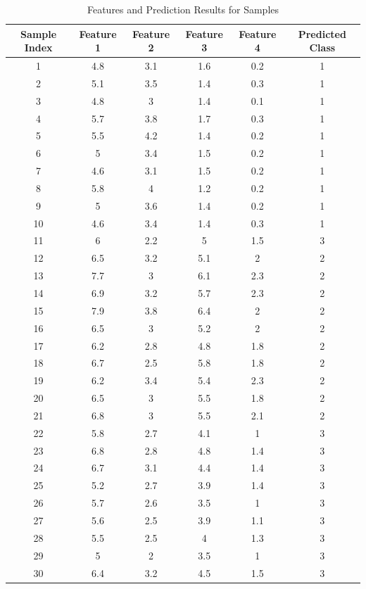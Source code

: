 \documentclass[12pt, onecolumn]{article}
\begin{document}
\begin{table}[ht]
\centering
\caption{Features and Prediction Results for Samples}
\label{tab:features_and_predictions}
\begin{tabular}{cccccc}
\toprule
Sample Index & Feature 1 & Feature 2 & Feature 3 & Feature 4 & Predicted Class \\
\midrule
1 & 4.8 & 3.1 & 1.6 & 0.2 & 1\\
2 & 5.1 & 3.5 & 1.4 & 0.3 & 1 \\
3 & 4.8 & 3 & 1.4 & 0.1 & 1\\
4 & 5.7 & 3.8 & 1.7 & 0.3 & 1\\
5 & 5.5 & 4.2 & 1.4 & 0.2 & 1\\
6 & 5 & 3.4 & 1.5 & 0.2 & 1\\
7 & 4.6 & 3.1 & 1.5 & 0.2 & 1\\
8 & 5.8 & 4 & 1.2 & 0.2 & 1\\
9 & 5 & 3.6 & 1.4 & 0.2 & 1\\
10 & 4.6 & 3.4 & 1.4 & 0.3 & 1\\
11 & 6 & 2.2 & 5 & 1.5 & 3\\
12 & 6.5 & 3.2 & 5.1 & 2 & 2\\
13 & 7.7 & 3 & 6.1 & 2.3 & 2\\
14 & 6.9 & 3.2 & 5.7 & 2.3 & 2\\
15 & 7.9 & 3.8 & 6.4 & 2 & 2\\
16 & 6.5 & 3 & 5.2 & 2 & 2\\
17 & 6.2 & 2.8 & 4.8 & 1.8 & 2\\
18 & 6.7 & 2.5 & 5.8 & 1.8 & 2\\
19 & 6.2 & 3.4 & 5.4 & 2.3 & 2\\
20 & 6.5 & 3 & 5.5 & 1.8 & 2\\
21 & 6.8 & 3 & 5.5 & 2.1 & 2\\
22 & 5.8 & 2.7 & 4.1 & 1 & 3\\
23 & 6.8 & 2.8 & 4.8 & 1.4 & 3\\
24 & 6.7 & 3.1 & 4.4 & 1.4 & 3\\
25 & 5.2 & 2.7 & 3.9 & 1.4 & 3\\
26 & 5.7 & 2.6 & 3.5 & 1 & 3\\
27 & 5.6 & 2.5 & 3.9 & 1.1 & 3\\
28 & 5.5 & 2.5 & 4 & 1.3 & 3\\
29 & 5 & 2 & 3.5 & 1 & 3\\
30 & 6.4 & 3.2 & 4.5 & 1.5 & 3\\
\bottomrule
\end{tabular}
\end{table}
\end{document}
